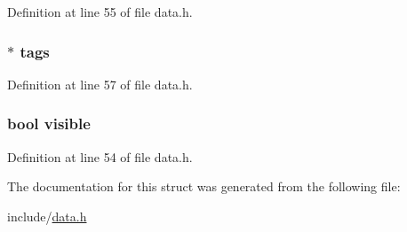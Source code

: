Definition at line 55 of file data.\+h.

\subsubsection[{\texorpdfstring{tags}{tags}}]{$\ast$ tags}\hypertarget{struct_way_a5b3cb60eeefcbc271683754bf243aebb}{}\label{struct_way_a5b3cb60eeefcbc271683754bf243aebb}


Definition at line 57 of file data.\+h.

\subsubsection[{\texorpdfstring{visible}{visible}}]{\setlength{\rightskip}{0pt plus 5cm}bool visible}\hypertarget{struct_way_aa54a57ae048476d840caf6d4d2c47aa3}{}\label{struct_way_aa54a57ae048476d840caf6d4d2c47aa3}


Definition at line 54 of file data.\+h.



The documentation for this struct was generated from the following file\+:\begin{DoxyCompactItemize}
\item 
include/\hyperlink{data_8h}{data.\+h}\end{DoxyCompactItemize}
